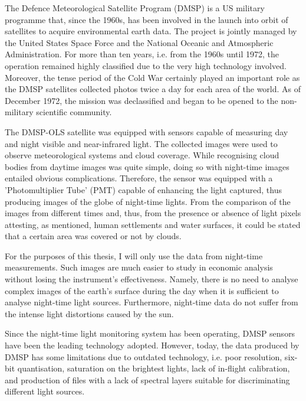 The Defence Meteorological Satellite Program (DMSP) is a US military programme that, since the 1960s, has been involved in the launch into orbit of satellites to acquire environmental earth data. The project is jointly managed by the United States Space Force and the National Oceanic and Atmospheric Administration.
For more than ten years, i.e. from the 1960s until 1972, the operation remained highly classified due to the very high technology involved. Moreover, the tense period of the Cold War certainly played an important role as the DMSP satellites collected photos twice a day for each area of the world.
As of December 1972, the mission was declassified and began to be opened to the non-military scientific community.

The DMSP-OLS satellite was equipped with sensors capable of measuring day and night visible and near-infrared light. The collected images were used to observe meteorological systems and cloud coverage. 
While recognising cloud bodies from daytime images was quite simple, doing so with night-time images entailed obvious complications. Therefore, the sensor  was equipped with a 'Photomultiplier Tube' (PMT) capable of enhancing the light captured, thus producing images of the globe of night-time lights. From the comparison of the images from different times and, thus, from the presence or absence of light pixels attesting, as mentioned, human settlements and water surfaces, it could be stated that a certain area was covered or not by clouds.

For the purposes of this thesis, I will only use the data from night-time measurements. Such images are much easier to study in economic analysis without losing the instrument's effectiveness. Namely, there is no need to analyse complex images of the earth's surface during the day when it is sufficient to analyse night-time light sources. Furthermore, night-time data do not suffer from the intense light distortions caused by the sun.

Since the night-time light monitoring system has been operating, DMSP sensors have been the leading technology adopted. However, today, the data produced by DMSP has some limitations due to outdated technology, i.e. poor resolution, six-bit quantisation, saturation on the brightest lights, lack of in-flight calibration, and production of files with a lack of spectral layers suitable for discriminating different light sources.

